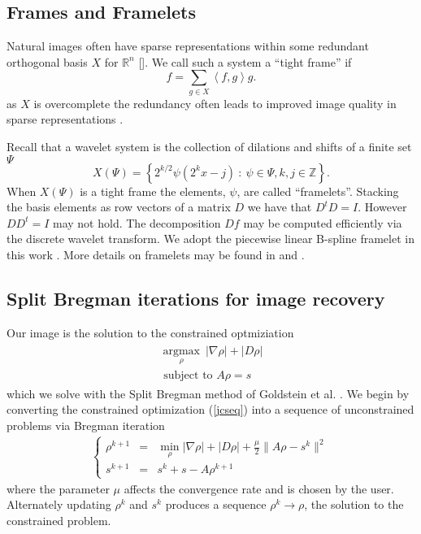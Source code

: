 \documentclass[11pt]{amsart}
\newcommand{\R}{\mathbb{R}}
\newcommand{\Z}{\mathbb{Z}}
\theoremstyle{remark}
\begin{document}
\subsection{Frames and Framelets}

Natural images often have sparse representations within some redundant orthogonal basis $X$ for $\R^n$ []. We call such a system a ``tight frame'' if
\begin{equation}
f = \sum_{g \in X} \left< f,g \right> g.
\end{equation}
as $X$ is overcomplete the redundancy often leads to improved image quality in sparse representations \cite{Daubechies2001}.

Recall that a wavelet system is the collection of dilations and shifts of a finite set $\Psi$
\begin{equation}
X(\Psi) = \left\{ 2^{k/2}\psi(2^kx-j) \: : \: \psi \in \Psi,k,j\in \Z \right\}.
\end{equation}
When $X(\Psi)$ is a tight frame the elements, $\psi$, are called ``framelets''. Stacking the basis elements as row vectors of a matrix $D$ we have that $D^tD = I$. However $DD^t = I$ may not hold. The decomposition $Df$ may be computed efficiently via the discrete wavelet transform. We adopt the piecewise linear B-spline framelet in this work \cite{Cai2010a}. More details on framelets may be found in \cite{Caia} \cite{Daubechies2001} and \cite{Cai2010a}.

\subsection{Split Bregman iterations for image recovery}

Our image is the solution to the constrained optmiziation
\begin{align}\label{jcseq}
\begin{array}{c}
\underset{\rho}{\operatorname{argmax}} \:  | \nabla \rho| + | D \rho | \\
\text{ subject to } A \rho = s
\end{array}
\end{align}
which we solve with the Split Bregman method of Goldstein et al. \cite{Goldstein2009a}. We begin by converting the constrained optimization (\ref{jcseq}) into a sequence of unconstrained problems via Bregman iteration \cite{Osher} 
\begin{align}\label{gbregman}
\left\{
    \begin{array}{rcl}
\rho^{k+1} &=& \min_\rho | \nabla \rho| + | D \rho | + \frac{\mu}{2} \| A\rho - s^k \|^2 \\
s^{k+1} &=& s^k + s - A\rho^{k+1}
\end{array}
\right.
\end{align}
where the parameter $\mu$ affects the convergence rate and is chosen by the user. Alternately updating $\rho^k$ and $s^k$ produces a sequence $\rho^k \rightarrow \rho$, the solution to the constrained problem.
\end{document}
